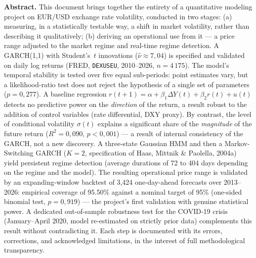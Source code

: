 \documentclass[12pt,a4paper]{article}
\begin{document}
\clearpage
\restoregeometry
\pagestyle{fancy}

\begin{titlepage}
	\begin{center}
		
		\begin{mdframed}[backgroundcolor=fxlight,linecolor=fxnavy,
			linewidth=1pt,innerleftmargin=12pt,
			innerrightmargin=12pt,innertopmargin=10pt,
			innerbottommargin=10pt]
			\textbf{Abstract.}
			This document brings together the entirety of a quantitative
			modeling project on EUR/USD exchange rate volatility, conducted in
			two stages: (a) measuring, in a statistically testable way, a
			shift in market volatility, rather than describing it
			qualitatively; (b) deriving an operational use from it --- a
			price range adjusted to the market regime and real-time
			regime detection. A GARCH(1,1) with Student's~$t$
			innovations ($\hat\nu \approx 7{,}04$) is specified and validated on
			daily log returns (FRED, \texttt{DEXUSEU}, 2010--2026, $n=4\,175$).
			The model's temporal stability is tested over five equal
			sub-periods: point estimates vary, but a
			likelihood-ratio test does not reject the hypothesis of a
			single set of parameters ($p=0{,}277$). A baseline regression
			$r(t+1) = \alpha + \beta_1 \Delta Y(t) + \beta_2 r(t) + u(t)$
			detects no predictive power on the \emph{direction} of the
			return, a result robust to the addition of control variables
			(rate differential, DXY proxy). By contrast, the level of
			conditional volatility $\sigma(t)$ explains a
			significant share of the \emph{magnitude} of the future return
			($R^2 = 0{,}090$, $p<0{,}001$) --- a result of internal consistency
			of the GARCH, not a new discovery. A three-state Gaussian HMM
			and then a Markov-Switching GARCH ($K=2$, specification of
			Haas, Mittnik \& Paolella, 2004a) yield persistent regime
			detection (average durations of 72 to 404 days depending on the
			regime and the model). The resulting operational price range
			is validated by an expanding-window backtest of 3,424
			one-day-ahead forecasts over 2013--2026: empirical coverage
			of 95.50\% against a nominal target of 95\% (one-sided
			binomial test, $p=0{,}919$) --- the project's first validation
			with genuine statistical power. A dedicated out-of-sample
			robustness test for the COVID-19 crisis (January--April 2020,
			model re-estimated on strictly prior data) complements this
			result without contradicting it. Each step is documented with its
			errors, corrections, and acknowledged limitations, in the
			interest of full methodological transparency.
		\end{mdframed}
		
	\end{center}
\end{titlepage}
\end{document}
